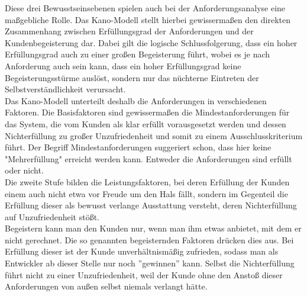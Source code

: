 \documentclass{swp1}
\begin{document}
Diese drei Bewusstseinsebenen spielen auch bei der Anforderungsanalyse eine maßgebliche Rolle. Das Kano-Modell stellt hierbei gewissermaßen den direkten Zusammenhang zwischen Erfüllungsgrad der Anforderungen und der Kundenbegeisterung dar. Dabei gilt die logische Schlussfolgerung, dass ein hoher Erfüllungsgrad auch zu einer großen Begeisterung führt, wobei es je nach Anforderung auch sein kann, dass ein hoher Erfüllungsgrad keine Begeisterungsstürme auslöst, sondern nur das nüchterne Eintreten der Selbstverständlichkeit verursacht.\\
Das Kano-Modell unterteilt deshalb die Anforderungen in verschiedenen Faktoren. Die Basisfaktoren sind gewissermaßen die Mindestanforderungen für das System, die vom Kunden als klar erfüllt vorausgesetzt werden und dessen Nichterfüllung zu großer Unzufriedenheit und somit zu einem Ausschlusskriterium führt. Der Begriff Mindestanforderungen suggeriert schon, dass hier keine "Mehrerfüllung" erreicht werden kann. Entweder die Anforderungen sind erfüllt oder nicht. \\
Die zweite Stufe bilden die Leistungsfaktoren, bei deren Erfüllung der Kunden einem auch nicht etwa vor Freude um den Hals fällt, sondern im Gegenteil die Erfüllung dieser als bewusst verlange Ausstattung versteht, deren Nichterfüllung auf Unzufriedenheit stößt.\\
Begeistern kann man den Kunden nur, wenn man ihm etwas anbietet, mit dem er nicht gerechnet. Die so genannten begeisternden Faktoren drücken dies aus. Bei Erfüllung dieser ist der Kunde unverhältnismäßig zufrieden, sodass man als Entwickler ab dieser Stelle nur noch ''gewinnen'' kann. Selbst die Nichterfüllung führt nicht zu einer Unzufriedenheit, weil der Kunde ohne den Anstoß dieser Anforderungen von außen selbst niemals verlangt hätte.
\end{document}
